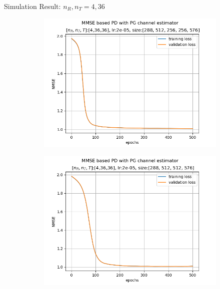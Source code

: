 \documentclass[hyperref={bookmarks=false}]{beamer}
\numberwithin{figure}{section}
\begin{document}
\begin{frame}{Simulation Result: $n_R, n_T = 4, 36$}

\begin{figure}[h!]
    \begin{subfigure}[b]{0.33\linewidth}
      \includegraphics[width=\linewidth]{figures/240502/lr2e-05_[288, 512, 256, 256, 576]_ep500.png}
    \end{subfigure}
    \begin{subfigure}[b]{0.33\linewidth}
      \includegraphics[width=\linewidth]{figures/240502/lr2e-05_[288, 512, 512, 576]_ep500.png}

\end{subfigure}
\end{figure}
\end{frame}
\end{document}
